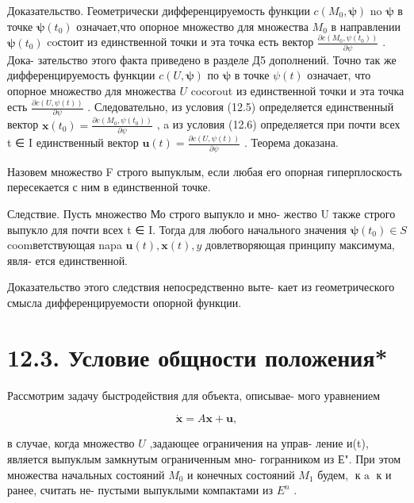 \documentclass[8pt]{extarticle}
\begin{document}
Доказательство. Геометрически дифференцируемость функции \(c\left( {{M}_{0},\mathbf{\psi }}\right)\) no \(\mathbf{\psi }\) в точке \(\mathbf{\psi }\left( {t}_{0}\right)\) означает,что опорное множество для множества \({M}_{0}\) в направлении \(\mathbf{\psi }\left( {t}_{0}\right)\) coстоит из единственной точки и эта точка есть вектор \(\frac{\partial c\left( {{M}_{0},\psi \left( {t}_{0}\right) }\right) }{\partial \psi }\) . Дока- зательство этого факта приведено в разделе Д5 дополнений. Точно так же дифференцируемость функции \(c\left( {U,\mathbf{\psi }}\right)\) по \(\mathbf{\psi }\) в точке \(\psi \left( t\right)\) означает, что опорное множество для множества \(U\) cocorout из единственной точки и эта точка есть \(\frac{\partial c\left( {U,\psi \left( t\right) }\right) }{\partial \psi }\) . Следовательно, из условия (12.5) определяется единственный вектор \(\mathbf{x}\left( {t}_{0}\right)  = \frac{\partial c\left( {{M}_{0},\psi \left( {t}_{0}\right) }\right) }{\partial \psi }\) , a из условия (12.6) определяется при почти всех t ∈ I единственный вектор \(\mathbf{u}\left( t\right)  = \frac{\partial c\left( {U,\psi \left( t\right) }\right) }{\partial \psi }\) . Теорема доказана.

Назовем множество F строго выпуклым, если любая его опорная гиперплоскость пересекается с ним в единственной точке.

Следствие. Пусть множество Мо строго выпукло и мно- жество U также строго выпукло для почти всех t ∈ I. Тогда для любого начального значения \(\mathbf{\psi }\left( {t}_{0}\right)  \in  S\) coomветствующая napa \(\mathbf{u}\left( t\right) ,\mathbf{x}\left( t\right) ,y\) довлетворяющая принципу максимума, явля- ется единственной.

Доказательство этого следствия непосредственно выте- кает из геометрического смысла дифференцируемости опорной функции.

\section*{12.3. Условие общности положения*}

Рассмотрим задачу быстродействия для объекта, описывае- мого уравнением

\[
\dot{\mathbf{x}} = A\mathbf{x} + \mathbf{u}, \tag{12.7}
\]

в случае, когда множество \(U\) ,задающее ограничения на управ- ление и(t), является выпуклым замкнутым ограниченным мно- гогранником из Е". При этом множества начальных состояний \({M}_{0}\) и конечных состояний \({M}_{1}\) будем, \(\operatorname{\text{ к }a}\) к и ранее, считать не- пустыми выпуклыми компактами из \({E}^{n}\) .
\end{document}
